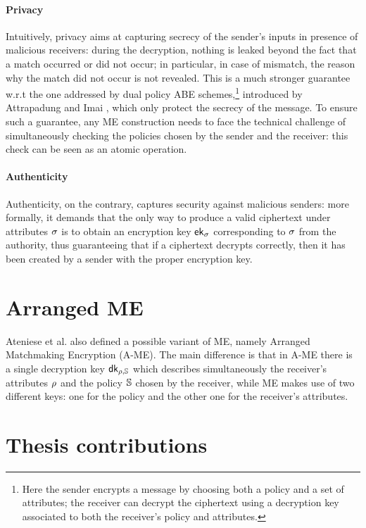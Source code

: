 \paragraph{Privacy}
Intuitively, privacy aims at capturing secrecy of the sender’s inputs in presence of malicious receivers: during the decryption, nothing is leaked beyond the fact that a match occurred or did not occur; in particular, in case of mismatch, the reason why the match did not occur is not revealed.
This is a much stronger guarantee w.r.t the one addressed by dual policy ABE schemes,\footnote{Here the sender encrypts a message by choosing both a policy and a set of attributes; the receiver can decrypt the ciphertext using a decryption key associated to both the receiver’s policy and attributes.} introduced by Attrapadung and Imai \cite{Attrapadung}, which only protect the secrecy of the message.
To ensure such a guarantee, any ME construction needs to face the technical challenge of simultaneously checking the policies chosen by the sender and the receiver: this check can be seen as an atomic operation.

\paragraph{Authenticity}
Authenticity, on the contrary, captures security against malicious senders: more formally, it demands that the only way to produce a valid ciphertext under attributes $\sigma$ is to obtain an encryption key $\mathsf{ek}_\sigma$ corresponding to $\sigma$ from the authority, thus guaranteeing that if a ciphertext decrypts correctly, then it has been created by a sender with the proper encryption key.

\section{Arranged ME}
Ateniese et al. also defined a possible variant of ME, namely Arranged Matchmaking Encryption (A-ME).
The main difference is that in A-ME there is a single decryption key $\mathsf{dk}_{\rho,\mathbb{S}}$ which describes simultaneously the receiver's
attributes $\rho$ and the policy $\mathbb{S}$ chosen by the receiver, while ME makes use of two different keys: one for the policy and the other one for the receiver's attributes.

\section{Thesis contributions}
